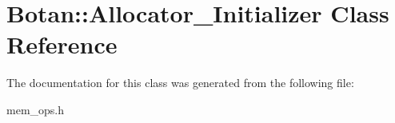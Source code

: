 \hypertarget{class_botan_1_1_allocator___initializer}{}\section{Botan\+:\+:Allocator\+\_\+\+Initializer Class Reference}
\label{class_botan_1_1_allocator___initializer}


The documentation for this class was generated from the following file\+:\begin{DoxyCompactItemize}
\item 
mem\+\_\+ops.\+h\end{DoxyCompactItemize}
